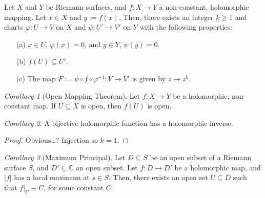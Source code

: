 \documentclass[a4paper]{report}
\theoremstyle{definition}
\theoremstyle{remark}
\theoremstyle{proposition}
\theoremstyle{conjecture}
\theoremstyle{lemma}
\theoremstyle{corollary}
\newtheorem{corollary}{Corollary}
\theoremstyle{exercise}
\theoremstyle{example}
\newcommand{\C}{\mathbb{C}}
\begin{document}
\begin{theorem}
    Let $X$ and $Y$ be Riemann surfaces, and $f: X\to Y$ a non-constant,
    holomorphic mapping. Let $x \in X$ and $y := f(x)$. Then, there exists 
    an integer $k\geq 1$ and charts $\varphi : U \to V$ on $X$ and 
    $\psi:U'\to V'$
    on $Y$ with the following properties:
    \begin{itemize}
        \item[(a)] $x\in U$, $\varphi(x) =0$, and $y\in Y$, $\psi(y) = 0$.
        \item[(b)] $f(U) \subseteq U'$. 
        \item[(c)] The map $F := \psi \circ f\circ \varphi^{-1} : V \to V'$
            is given by $z\mapsto z^k$.
    \end{itemize}
\end{theorem}


\begin{corollary}[Open Mapping Theorem]
    Let $f: X\to Y$ be a holomorphic, non-constant map. If $U\subseteq X$ 
    is open, then $f(U)$ is open. 
\end{corollary}

\begin{corollary}
    A bijective holomorphic function has a holomorphic inverse.
\end{corollary}

\begin{proof}
    Obvious\ldots? Injection so $k=1$.
\end{proof}

\begin{corollary}[Maximum Principal]
    Let $D\subseteq S$ be an open subset of a Riemann surface $S$, and 
    $D' \subseteq \C$ an open subset. Let $f : D \to D'$ be a holomorphic map,
    and $\vert f\vert$ has a local maximum at $s\in S$. Then, there 
    exists an open set $U\subseteq D$ such that $f\vert_U \equiv C$,
    for some constant $C$.
\end{corollary}
\end{document}
